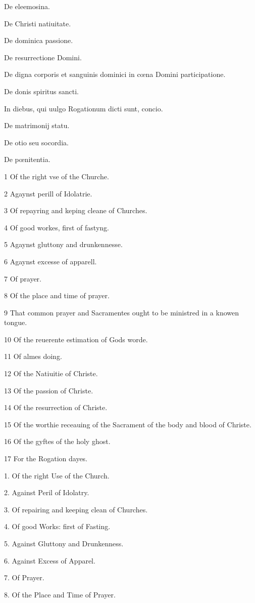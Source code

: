De eleemosina.

De Christi natiuitate.

De dominica passione.

De resurrectione Domini.

De digna corporis et sanguinis dominici in cœna Domini participatione.

De donis spiritus sancti.

In diebus, qui uulgo Rogationum dicti sunt, concio.

De matrimonij statu.

De otio seu socordia.

De pœnitentia.

1 Of the right vse of the Churche.

2 Agaynst perill of Idolatrie.

3 Of repayring and keping cleane of Churches.

4 Of good workes, first of fastyng.

5 Agaynst gluttony and drunkennesse.

6 Agaynst excesse of apparell.

7 Of prayer.

8 Of the place and time of prayer.

9 That common prayer and Sacramentes ought to be ministred in a knowen tongue.

10 Of the reuerente estimation of Gods worde.

11 Of almes doing.

12 Of the Natiuitie of Christe.

13 Of the passion of Christe.

14 Of the resurrection of Christe.

15 Of the worthie receauing of the Sacrament of the body and blood of Christe.

16 Of the gyftes of the holy ghost.

17 For the Rogation dayes.

1. Of the right Use of the Church.

2. Against Peril of Idolatry.

3. Of repairing and keeping clean of Churches.

4. Of good Works: first of Fasting.

5. Against Gluttony and Drunkenness.

6. Against Excess of Apparel.

7. Of Prayer.

8. Of the Place and Time of Prayer.

